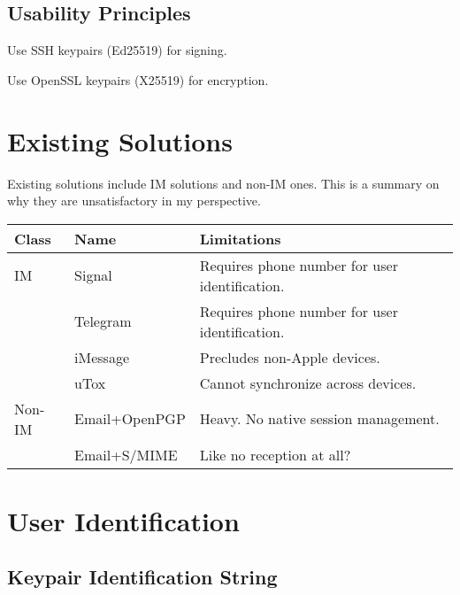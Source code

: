 \subsection{Usability Principles}

\begin{compactitem}
	\item Use SSH keypairs (Ed25519) for signing.
	\item Use OpenSSL keypairs (X25519) for encryption.
\end{compactitem}










\section{Existing Solutions}

Existing solutions include IM solutions and non-IM ones. This is a summary on why they are unsatisfactory in my perspective.

\begin{tabu}{|l|l|X|}
	\hline
	{Class}  & {Name}          & {Limitations}                                    \\
	\hline
	{IM}     & {Signal}        & {Requires phone number for user identification.} \\
	{ }      & {Telegram}      & {Requires phone number for user identification.} \\
	{ }      & {iMessage}      & {Precludes non-Apple devices.}                   \\
	{ }      & {uTox}          & {Cannot synchronize across devices.}             \\
	\hline
	{Non-IM} & {Email+OpenPGP} & {Heavy. No native session management.}           \\
	{ }      & {Email+S/MIME}  & {Like no reception at all?}                      \\
	\hline
\end{tabu}










\section{User Identification}

\subsection{Keypair Identification String}

